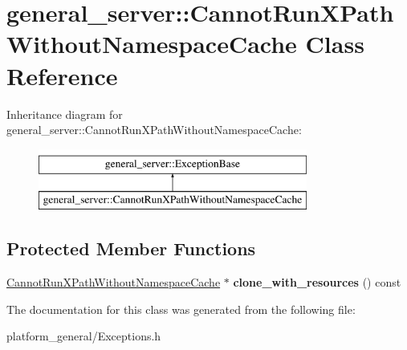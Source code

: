 \hypertarget{classgeneral__server_1_1CannotRunXPathWithoutNamespaceCache}{\section{general\-\_\-server\-:\-:\-Cannot\-Run\-X\-Path\-Without\-Namespace\-Cache \-Class \-Reference}
\label{classgeneral__server_1_1CannotRunXPathWithoutNamespaceCache}
}
\-Inheritance diagram for general\-\_\-server\-:\-:\-Cannot\-Run\-X\-Path\-Without\-Namespace\-Cache\-:\begin{figure}[H]
\begin{center}
\leavevmode
\includegraphics[height=2.000000cm]{classgeneral__server_1_1CannotRunXPathWithoutNamespaceCache}
\end{center}
\end{figure}
\subsection*{\-Protected \-Member \-Functions}
\begin{DoxyCompactItemize}
\item 
\hypertarget{classgeneral__server_1_1CannotRunXPathWithoutNamespaceCache_aa3d70be14332c4acb34737c10ed08503}{\hyperlink{classgeneral__server_1_1CannotRunXPathWithoutNamespaceCache}{\-Cannot\-Run\-X\-Path\-Without\-Namespace\-Cache} $\ast$ {\bfseries clone\-\_\-with\-\_\-resources} () const }\label{classgeneral__server_1_1CannotRunXPathWithoutNamespaceCache_aa3d70be14332c4acb34737c10ed08503}

\end{DoxyCompactItemize}


\-The documentation for this class was generated from the following file\-:\begin{DoxyCompactItemize}
\item 
platform\-\_\-general/\-Exceptions.\-h\end{DoxyCompactItemize}

